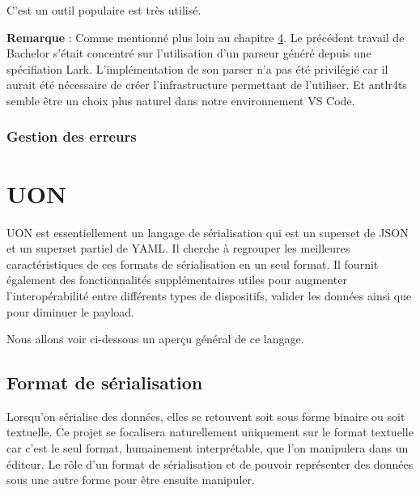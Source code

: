 \documentclass[
    iict, %
    il, %
]{heig-tb}
\begin{document}

C'est un outil populaire est très utilisé.

\textbf{Remarque} :
Comme mentionné plus loin au chapitre \hyperref[grammar scope]{4}. Le précédent travail de Bachelor s'était concentré sur l'utilisation d'un parseur généré depuis une spécifiation Lark.
L'implémentation de son parser n'a pas été privilégié car il aurait été nécessaire de créer l'infrastructure permettant de l'utiliser.
Et antlr4ts semble être un choix plus naturel dans notre environnement VS Code.


\subsubsection{Gestion des erreurs}


\section{UON}
UON est essentiellement un langage de sérialisation qui est un superset de JSON et un superset partiel de YAML.
Il cherche à regrouper les meilleures caractéristiques de ces formats de sérialisation en un seul format.
Il fournit également des fonctionnalités supplémentaires utiles pour augmenter l'interopérabilité entre différents types de dispositifs, valider les données ainsi que pour diminuer le payload.

Nous allons voir ci-dessous un aperçu général de ce langage.

\subsection{Format de sérialisation}

Lorsqu'on sérialise des données, elles se retouvent soit sous forme binaire ou soit textuelle.
Ce projet se focalisera naturellement uniquement sur le format textuelle car c'est le seul format, humainement interprétable, que l'on manipulera dans un éditeur.
Le rôle d'un format de sérialisation et de pouvoir représenter des données sous une autre forme pour être ensuite manipuler.
\end{document}
